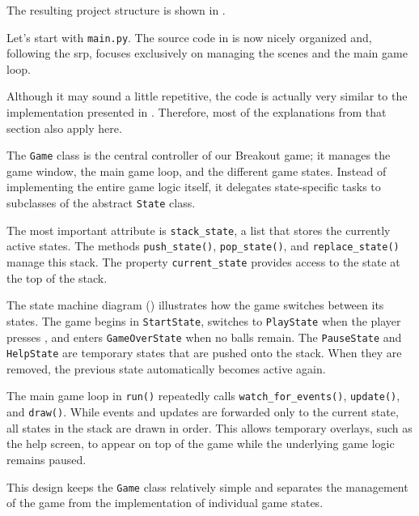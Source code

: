 The resulting project structure is shown in .

\clearpage

Let's start with \texttt{main.py}. The source code in  is now nicely organized and, following the \Gls{srp}, focuses exclusively on managing the scenes and the main game loop.

Although it may sound a little repetitive, the code is actually very similar to the implementation presented in . Therefore, most of the explanations from that section also apply here.

The \texttt{Game} class is the central controller of our Breakout game; it manages the game window, the main game loop, and the different game states. Instead of implementing the entire game logic itself, it delegates state-specific tasks to subclasses of the abstract \texttt{State} class.

The most important attribute is \texttt{stack\_state}, a list that stores the currently active states. The methods \texttt{push\_state()}, \texttt{pop\_state()}, and \texttt{replace\_state()} manage this stack. The property \texttt{current\_state} provides access to the state at the top of the stack.

The state machine diagram () illustrates how the game switches between its states. The game begins in \texttt{StartState}, switches to \texttt{PlayState} when the player presses , and enters \texttt{GameOverState} when no balls remain. The \texttt{PauseState} and \texttt{Help\-State} are temporary states that are pushed onto the stack. When they are removed, the previous state automatically becomes active again.

The main game loop in \texttt{run()} repeatedly calls \texttt{watch\_for\_events()}, \texttt{update()}, and \texttt{draw()}. While events and updates are forwarded only to the current state, all states in the stack are drawn in order. This allows temporary overlays, such as the help screen, to appear on top of the game while the underlying game logic remains paused.

This design keeps the \texttt{Game} class relatively simple and separates the management of the game from the implementation of individual game states.


